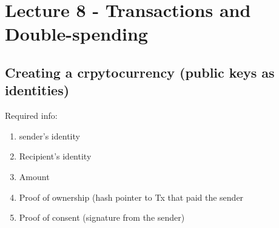 \documentclass[../main.tex]{subfile}
\begin{document}
\section{Lecture 8 - Transactions and Double-spending}
\subsection{Creating a crpytocurrency (public keys as identities)}
Required info:
\begin{enumerate}
	\item sender's identity
	\item Recipient's identity
	\item Amount
	\item Proof of ownership (hash pointer to Tx that paid the sender
	\item Proof of consent (signature from the sender)
\end{enumerate}
\end{document}
